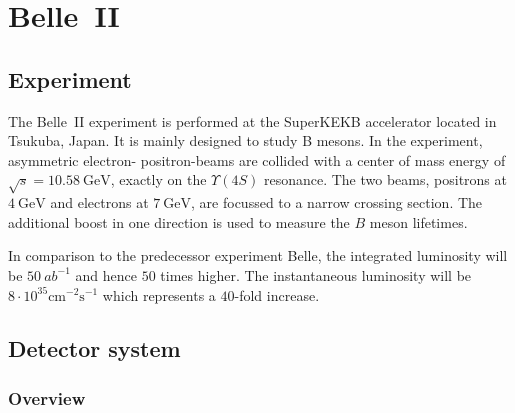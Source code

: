 \chapter{Belle~\RN{2}}
\label{chap:belle2_experiment}

\section{Experiment}
\label{sec:experimental}

The Belle~\RN{2} experiment is performed at the SuperKEKB accelerator located in Tsukuba, Japan. It is mainly designed to study B mesons.
In the experiment, asymmetric electron- positron-beams are collided with a center of mass energy of $\sqrt{s} = 10.58 \mathrm{~GeV}$, exactly on the $\Upsilon (4S)$ resonance. The two beams, positrons at $4 \mathrm{~GeV}$ and electrons at $7 \mathrm{~GeV}$, are focussed to a narrow crossing section. The additional boost in one direction is used to measure the $B$ meson lifetimes.

In comparison to the predecessor experiment Belle, the integrated luminosity will be $50~{ab}^{-1}$ and hence $50$ times higher. The instantaneous luminosity will be $8 \cdot 10^{35} \mathrm{cm}^{-2} \mathrm{s}^{-1}$ which represents a $40$-fold increase.

\section{Detector system}
\label{sec:detector_system}

\subsection{Overview}
\label{sec:detector_system_overview}

